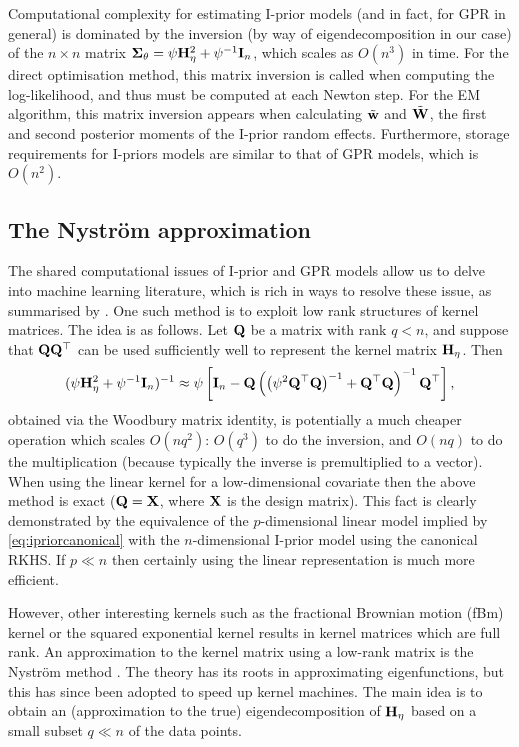 Computational complexity for estimating I-prior models (and in fact, for GPR in general) is dominated by the inversion (by way of eigendecomposition in our case) of the $n \times n$ matrix ${\bm\Sigma}_\theta = \psi{\mathbf H}_\eta^2 + \psi^{-1}{\mathbf I}_n$, which scales as $O(n^3)$ in time.
For the direct optimisation method, this matrix inversion is called when computing the log-likelihood, and thus must be computed at each Newton step.
For the EM algorithm, this matrix inversion appears when calculating $\tilde {{\mathbf w}}$ and $\tilde {{\mathbf W}}$, the first and second posterior moments of the I-prior random effects.
Furthermore, storage requirements for I-priors models are similar to that of GPR models, which is $O(n^2)$.

\subsection[The Nystrom approximation]{The Nyström approximation}

The shared computational issues of I-prior and GPR models allow us to delve into machine learning literature, which is rich in ways to resolve these issue, as summarised by \citet{quinonero2005unifying}.
One such method is to exploit low rank structures of kernel matrices.
The idea is as follows.
Let ${\mathbf Q}$ be a matrix with rank $q < n$, and suppose that ${\mathbf Q}{\mathbf Q}^\top$ can be used sufficiently well to represent the kernel matrix ${\mathbf H}_\eta$.
Then
%
\[
  (\psi{\mathbf H}_\eta^2 + \psi^{-1}{\mathbf I}_n)^{-1} \approx
  \psi\left[
  {\mathbf I}_n -
  {\mathbf Q}\left( \big(\psi^2{\mathbf Q}^\top{\mathbf Q}\big)^{-1} +{\mathbf Q}^\top{\mathbf Q} \right)^{-1} {\mathbf Q}^\top
  \right],
\]
%
obtained via the Woodbury matrix identity, is potentially a much cheaper operation which scales $O(nq^2)$: $O(q^3)$ to do the inversion, and $O(nq)$ to do the multiplication (because typically the inverse is premultiplied to a vector).
When using the linear kernel for a low-dimensional covariate then the above method is exact (${\mathbf Q} = {\mathbf X}$, where ${\mathbf X}$ is the design matrix).
This fact is clearly demonstrated by the equivalence of the $p$-dimensional linear model implied by \cref{eq:ipriorcanonical} with the $n$-dimensional I-prior model using the canonical RKHS.
If $p \ll n$ then certainly using the linear representation is much more efficient.

However, other interesting kernels such as the fractional Brownian motion (fBm) kernel or the squared exponential kernel results in kernel matrices which are full rank.
An approximation to the kernel matrix using a low-rank matrix is the Nystr\"om method \citep{williams2001using}.
The theory has its roots in approximating eigenfunctions, but this has since been adopted to speed up kernel machines.
The main idea is to obtain an (approximation to the true) eigendecomposition of ${\mathbf H}_\eta$ based on a small subset $q \ll n$ of the data points.

